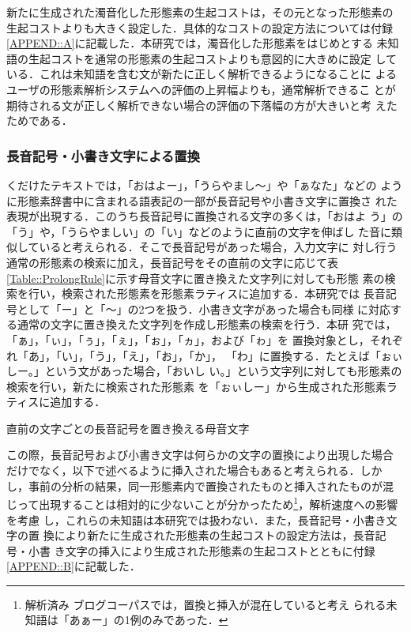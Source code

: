 \documentclass[japanese]{jnlp_1.4}
\begin{document}
   新たに生成された濁音化した形態素の生起コストは，その元となった形態素の
   生起コストよりも大きく設定した．具体的なコストの設定方法については付録
   \ref{APPEND::A}に記載した．本研究では，濁音化した形態素をはじめとする
   未知語の生起コストを通常の形態素の生起コストよりも意図的に大きめに設定
   している．これは未知語を含む文が新たに正しく解析できるようになることに
   よるユーザの形態素解析システムへの評価の上昇幅よりも，通常解析できるこ
   とが期待される文が正しく解析できない場合の評価の下落幅の方が大きいと考
   えたためである．
 

   \subsubsection{長音記号・小書き文字による置換}

   くだけたテキストでは，「おはよー」，「うらやまし〜」や「ぁなた」などの
   ように形態素辞書中に含まれる語表記の一部が長音記号や小書き文字に置換さ
   れた表現が出現する．このうち長音記号に置換される文字の多くは，「おはよ
   う」の「う」や，「うらやましい」の「い」などのように直前の文字を伸ばし
   た音に類似していると考えられる．そこで長音記号があった場合，入力文字に
   対し行う通常の形態素の検索に加え，長音記号をその直前の文字に応じて表
   \ref{Table::ProlongRule}に示す母音文字に置き換えた文字列に対しても形態
   素の検索を行い，検索された形態素を形態素ラティスに追加する．本研究では
   長音記号として「ー」と「〜」の2つを扱う．小書き文字があった場合も同様
   に対応する通常の文字に置き換えた文字列を作成し形態素の検索を行う．本研
   究では，「ぁ」，「ぃ」，「ぅ」，「ぇ」，「ぉ」，「ヵ」，および「ゎ」を
   置換対象とし，それぞれ「あ」，「い」，「う」，「え」，「お」，「か」，
   「わ」に置換する．たとえば「ぉぃしー。」という文があった場合，「おいし
   い。」という文字列に対しても形態素の検索を行い，新たに検索された形態素
   を「ぉぃしー」から生成された形態素ラティスに追加する．

   \begin{table}[b]
    \caption{直前の文字ごとの長音記号を置き換える母音文字}
\label{Table::ProlongRule}

   \end{table}

   この際，長音記号および小書き文字は何らかの文字の置換により出現した場合
   だけでなく，以下で述べるように挿入された場合もあると考えられる．しか
   し，事前の分析の結果，同一形態素内で置換されたものと挿入されたものが混
   じって出現することは相対的に少ないことが分かったため\footnote{解析済み
   ブログコーパス\cite{Hashimoto2011}では，置換と挿入が混在していると考え
   られる未知語は「あぁー」の1例のみであった．}，解析速度への影響を考慮
   し，これらの未知語は本研究では扱わない．また，長音記号・小書き文字の置
   換により新たに生成された形態素の生起コストの設定方法は，長音記号・小書
   き文字の挿入により生成された形態素の生起コストとともに付録
   \ref{APPEND::B}に記載した．
\end{document}
